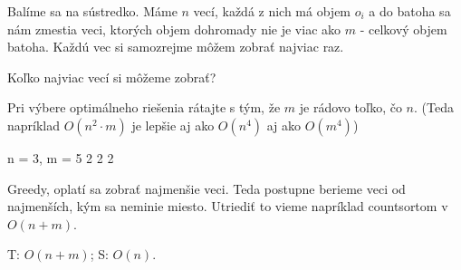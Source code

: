 
Balíme sa na sústredko. Máme $n$ vecí, každá z nich má objem $o_i$ a do batoha
sa nám zmestia veci, ktorých objem dohromady nie je viac ako $m$ - celkový objem batoha.
Každú vec si samozrejme môžem zobrať najviac raz.

Koľko najviac vecí si môžeme zobrať?

Pri výbere optimálneho riešenia rátajte s tým, že $m$ je rádovo toľko, čo $n$.
(Teda napríklad $O(n^2 \cdot m)$ je lepšie aj ako $O(n^4)$ aj ako $O(m^4)$)

\vstup
n = 3, m = 5
2 2 2


\koniec

Greedy, oplatí sa zobrať najmenšie veci. Teda postupne
berieme veci od najmenších, kým sa neminie miesto. 
Utriediť to vieme napríklad countsortom v $O(n+m)$. 

T: $O(n+m)$; S: $O(n)$.
